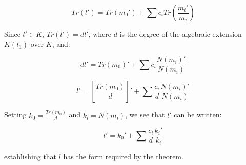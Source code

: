 \begin{enumerate}
$$Tr(l') = Tr(m_0') + \sum c_i Tr \left( \frac{m_i'}{m_i} \right)$$

Since $l' \in K$, $Tr(l') = d l'$, where $d$ is the degree of the
algebraic extension $K(t_1)$ over $K$, and:

$$d l' = Tr(m_0)' + \sum c_i \frac{N(m_i)'}{N(m_i)}$$

$$l' = \left[ \frac{Tr(m_0)}{d} \right]' + \sum \frac{c_i}{d} \frac{N(m_i)'}{N(m_i)}$$

Setting $k_0 = \frac{Tr(m_0)}{d}$ and $k_i = N(m_i)$, we see that $l'$
can be written:

$$l' = k_0' + \sum \frac{c_i}{d} \frac{k_i'}{k_i}$$

establishing that $l$ has the form required by the theorem.


\end{enumerate}


\begin{comment}

Let $M = K(t_1,\ldots,t_{n-1})$,
so $L = M(t_n)$ is a simple Liouvillian extension of $L$, and the
theorem holds for $M$.

If $L = M(t_n)$ is either an exponential or an algebraic extension
of $M$, then Theorem \ref{basic exponential properties}(4) or
Theorem \ref{basic algebraic properties}(3) establishes that
for $l \in L$, if $l' \in M$ then $l \in M$.  Since $l' \in K$
implies $l' \in M$, we conclude that $l \in M$ and the
theorem holds by induction.

The other case we must consider is when $L = M(t_n)$ is an
logarithm extension of $M$.  In this case, we again know
that $l' \in K$ implies that $l' \in M$, and Theorem
\ref{basic logarithmic properties}(5) tells us that
$l$ must have the form

$$l = m + c t_n \qquad l' = m' + c \frac{m_1'}{m_1}$$

\end{comment}


\begin{comment}

Since $L$ is formed from $K$ by a finite number of simple extensions,
consider the last extension and call it $\theta$, i.e, $L=M(\theta)$
where $K \subset M \subset L$, and $\theta$ is either algebraic,
logarithmic, or exponential over $M$.

Since $l' \in K$, $l' \in M$.  If
$\theta$ were either exponential or algebraic, then by Theorems
\ref{basic exponential properties} and \ref{basic algebraic properties}
$l$ would have to be in $M$.  On the other hand, if $\theta$ were
logarithmic, then by Theorem \ref{basic logarithmic properties} $l$
must have the form $c\theta + m$, where $m\in M$.  Applying this
argument inductively leads us to conclude that $l$ must have the
form...  (FIX AND FINISH THIS PROOF)

\end{comment}

\endtheorem
